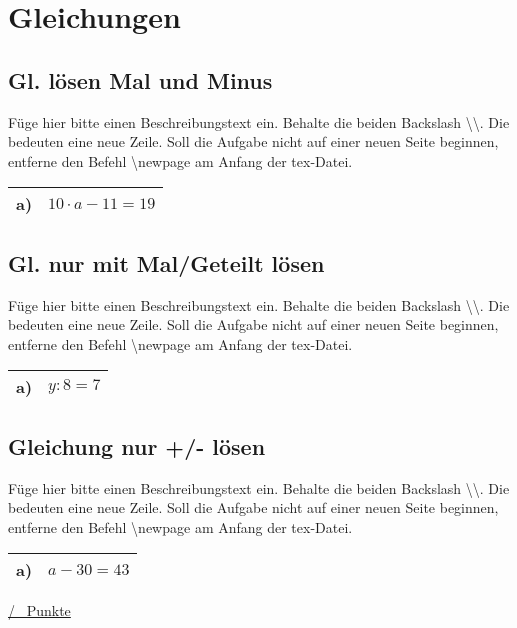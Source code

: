 \newpage
\section{Gleichungen}
\subsection{Gl. lösen Mal und Minus}
Füge hier bitte einen Beschreibungstext ein. Behalte die beiden Backslash \textbackslash\textbackslash. Die bedeuten eine neue Zeile. Soll die Aufgabe nicht auf einer neuen Seite beginnen, entferne den Befehl \textbackslash newpage am Anfang der tex-Datei.\\
\begin{xltabular}{\textwidth}{|C{0.75cm}|X|}
\hline
a)&$10\cdot a-11=19$
\\\hline
\end{xltabular}
\vspace{0.5cm}
\subsection{Gl. nur mit Mal/Geteilt lösen}
Füge hier bitte einen Beschreibungstext ein. Behalte die beiden Backslash \textbackslash\textbackslash. Die bedeuten eine neue Zeile. Soll die Aufgabe nicht auf einer neuen Seite beginnen, entferne den Befehl \textbackslash newpage am Anfang der tex-Datei.\\
\begin{xltabular}{\textwidth}{|C{0.75cm}|X|}
\hline
a)&$y:8=7$
\\\hline
\end{xltabular}
\vspace{0.5cm}
\subsection{Gleichung nur +/- lösen}
Füge hier bitte einen Beschreibungstext ein. Behalte die beiden Backslash \textbackslash\textbackslash. Die bedeuten eine neue Zeile. Soll die Aufgabe nicht auf einer neuen Seite beginnen, entferne den Befehl \textbackslash newpage am Anfang der tex-Datei.\\
\begin{xltabular}{\textwidth}{|C{0.75cm}|X|}
\hline
a)&$a-30 = 43$
\\\hline
\end{xltabular}
\vspace{0.5cm}
\begin{flushright}
\underline{\hspace{2cm}/ \punkte~Punkte}
\end{flushright}